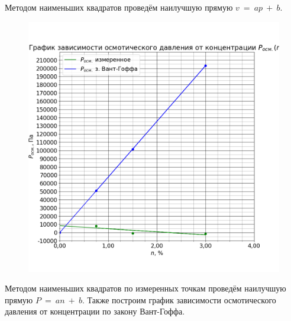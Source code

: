 Методом наименьших квадратов проведём наилучшую прямую $v~=~ap~+~b$.



\begin{figure}[H]
	\centering
	\includegraphics[width=1 \textwidth]{../plots/graph_p_osm_n.png}
\end{figure}

Методом наименьших квадратов по измеренных точкам проведём наилучшую прямую $P~=~an~+~b$. Также построим график зависимости осмотического давления от концентрации по закону Вант-Гоффа.

